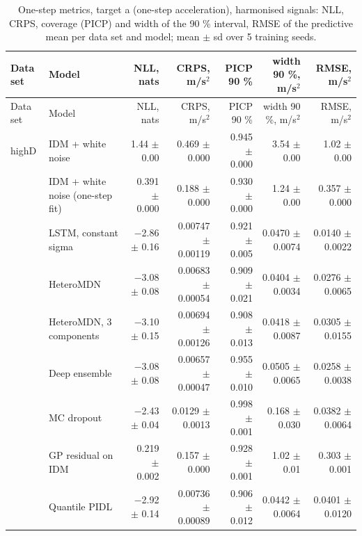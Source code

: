 \begingroup
\footnotesize
\begin{longtable}{llrrrrr}
\caption{One-step metrics, target a (one-step acceleration), harmonised signals: NLL, CRPS, coverage (PICP) and width of the 90 \% interval, RMSE of the predictive mean per data set and model; mean $\pm$ sd over 5 training seeds.}\label{tab:t1-one-step--harmonised--a} \\
\toprule
Data set & Model & NLL, nats & CRPS, m/s$^2$ & PICP 90 \% & width 90 \%, m/s$^2$ & RMSE, m/s$^2$ \\
\midrule
\endfirsthead
\toprule
Data set & Model & NLL, nats & CRPS, m/s$^2$ & PICP 90 \% & width 90 \%, m/s$^2$ & RMSE, m/s$^2$ \\
\midrule
\endhead
\bottomrule
\endlastfoot
highD & IDM + white noise & 1.44 $\pm$ 0.00 & 0.469 $\pm$ 0.000 & 0.945 $\pm$ 0.000 & 3.54 $\pm$ 0.00 & 1.02 $\pm$ 0.00 \\
 & IDM + white noise (one-step fit) & 0.391 $\pm$ 0.000 & 0.188 $\pm$ 0.000 & 0.930 $\pm$ 0.000 & 1.24 $\pm$ 0.00 & 0.357 $\pm$ 0.000 \\
 & LSTM, constant sigma & $-$2.86 $\pm$ 0.16 & 0.00747 $\pm$ 0.00119 & 0.921 $\pm$ 0.005 & 0.0470 $\pm$ 0.0074 & 0.0140 $\pm$ 0.0022 \\
 & HeteroMDN & $-$3.08 $\pm$ 0.08 & 0.00683 $\pm$ 0.00054 & 0.909 $\pm$ 0.021 & 0.0404 $\pm$ 0.0034 & 0.0276 $\pm$ 0.0065 \\
 & HeteroMDN, 3 components & $-$3.10 $\pm$ 0.15 & 0.00694 $\pm$ 0.00126 & 0.908 $\pm$ 0.013 & 0.0418 $\pm$ 0.0087 & 0.0305 $\pm$ 0.0155 \\
 & Deep ensemble & $-$3.08 $\pm$ 0.08 & 0.00657 $\pm$ 0.00047 & 0.955 $\pm$ 0.010 & 0.0505 $\pm$ 0.0065 & 0.0258 $\pm$ 0.0038 \\
 & MC dropout & $-$2.43 $\pm$ 0.04 & 0.0129 $\pm$ 0.0013 & 0.998 $\pm$ 0.001 & 0.168 $\pm$ 0.030 & 0.0382 $\pm$ 0.0064 \\
 & GP residual on IDM & 0.219 $\pm$ 0.002 & 0.157 $\pm$ 0.000 & 0.928 $\pm$ 0.001 & 1.02 $\pm$ 0.01 & 0.303 $\pm$ 0.001 \\
 & Quantile PIDL & $-$2.92 $\pm$ 0.14 & 0.00736 $\pm$ 0.00089 & 0.906 $\pm$ 0.012 & 0.0442 $\pm$ 0.0064 & 0.0401 $\pm$ 0.0120 \\

\end{longtable}
